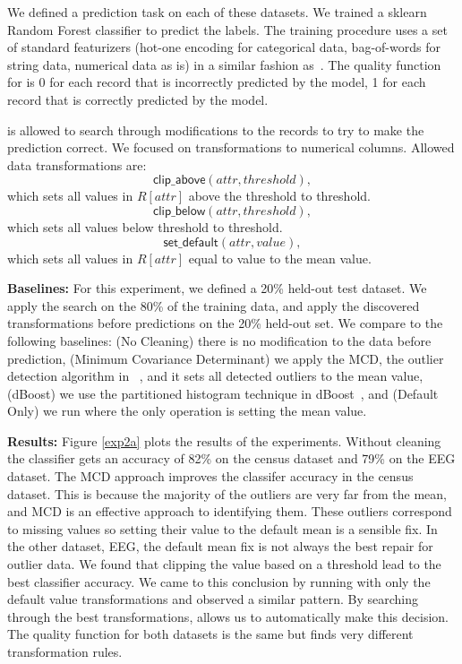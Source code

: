 \vspace{0.5em}
We defined a prediction task on each of these datasets. We trained a \textsf{sklearn} Random Forest classifier to predict the labels. The training procedure uses a set of standard featurizers (hot-one encoding for categorical data, bag-of-words for string data, numerical data as is) in a similar fashion as~\cite{gokhale2014corleone}. The quality function for \sys is 0 for each record that is incorrectly predicted by the model, 1 for each record that is correctly predicted by the model.

\sys is allowed to search through modifications to the records to try to make the prediction correct. We focused on transformations to numerical columns. Allowed data transformations are:
\[
\textsf{clip\_above}(attr, threshold), 
\]
which sets all values in $R[attr]$ above the threshold to threshold.
\[
\textsf{clip\_below}(attr, threshold), 
\]
which sets all values below threshold to threshold.
\[
\textsf{set\_default}(attr, value), 
\]
which sets all values in $R[attr]$ equal to value to the mean value.

\vspace{0.5em}\noindent\textbf{Baselines: } For this experiment, we defined a 20\% held-out test dataset. We apply the search on the 80\% of the training data, and apply the discovered transformations before predictions on the 20\% held-out set. 
We compare to the following baselines: (No Cleaning) there is no modification to the data before prediction, (Minimum Covariance Determinant) we apply the MCD, the outlier detection algorithm in ~\cite{bailis2016macrobase}, and it sets all detected outliers to the mean value, (dBoost) we use the partitioned histogram technique in dBoost~\cite{mariet2016outlier}, and (Default Only) we run \sys where the only operation is setting the mean value. 

\vspace{0.5em}\noindent\textbf{Results: } Figure \ref{exp2a} plots the results of the experiments. Without cleaning the classifier gets an accuracy of 82\% on the census dataset and 79\% on the EEG dataset. The MCD approach improves the classifer accuracy in the census dataset. This is because the majority of the outliers are very far from the mean, and MCD is an effective approach to identifying them. These outliers correspond to missing values so setting their value to the default mean is a sensible fix.
In the other dataset, EEG, the default mean fix is not always the best repair for outlier data. 
We found that clipping the value based on a threshold lead to the best classifier accuracy.
We came to this conclusion by running \sys with only the default value transformations and observed a similar pattern. 
By searching through the best transformations, \sys allows us to automatically make this decision.
The quality function for both datasets is the same but \sys finds very different transformation rules.

